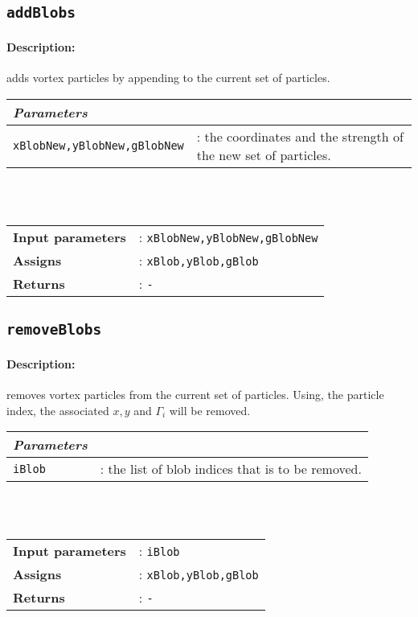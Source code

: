		
\subsection{\texttt{addBlobs}}
	\paragraph{Description:} adds vortex particles by appending to the current set of particles.\\
	
	 \begin{tabular}{lp{10cm}}
				\textit{Parameters} & \\ \hline
		   		\texttt{xBlobNew,yBlobNew,gBlobNew} &: the coordinates and the strength of the new set of particles.\\
		\end{tabular} \vspace{5 mm}\\
	\\		
	\begin{tabular}{lp{10cm}}
		\textbf{Input parameters} &: \texttt{xBlobNew,yBlobNew,gBlobNew}\\
		\textbf{Assigns} &: \texttt{xBlob,yBlob,gBlob}\\
		\textbf{Returns} &: \texttt{-}\\
	\end{tabular}


\subsection{\texttt{removeBlobs}}
	\paragraph{Description:} removes vortex particles from the current set of particles. Using, the particle index, the associated $x,y$ and $\Gamma_i$ will be removed.\\
	
	 \begin{tabular}{lp{10cm}}
				\textit{Parameters} & \\ \hline
		   		\texttt{iBlob} &: the list of blob indices that is to be removed.\\
		\end{tabular} \vspace{5 mm}\\
	\\		
	\begin{tabular}{lp{10cm}}
		\textbf{Input parameters} &: \texttt{iBlob}\\
		\textbf{Assigns} &: \texttt{xBlob,yBlob,gBlob}\\
		\textbf{Returns} &: \texttt{-}\\
	\end{tabular}
	
